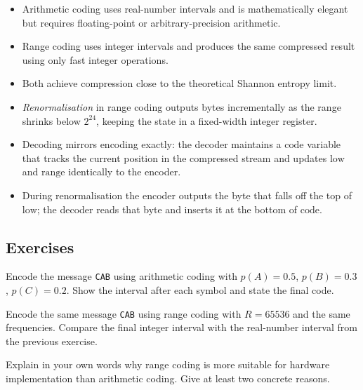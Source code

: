 \begin{itemize}[leftmargin=2em]
    \item Arithmetic coding uses real-number intervals and is mathematically 
          elegant but requires floating-point or arbitrary-precision arithmetic.
    \item Range coding uses integer intervals and produces the same compressed
          result using only fast integer operations.
    \item Both achieve compression close to the theoretical Shannon entropy 
          limit.
    \item \emph{Renormalisation} in range coding outputs bytes incrementally 
          as the range shrinks below $2^{24}$, keeping the state in a 
          fixed-width integer register.
    \item Decoding mirrors encoding exactly: the decoder maintains a 
          $\mathrm{code}$ variable that tracks the current position in the 
          compressed stream and updates $\mathrm{low}$ and $\mathrm{range}$ 
          identically to the encoder.
    \item During renormalisation the encoder outputs the byte that falls off 
          the top of $\mathrm{low}$; the decoder reads that byte and inserts 
          it at the bottom of $\mathrm{code}$.
\end{itemize}

\subsection{Exercises}

\begin{exercisebox}
Encode the message \texttt{CAB} using arithmetic coding with $p(A)=0.5$,
$p(B)=0.3$, $p(C)=0.2$.  Show the interval after each symbol and state the
final code.
\end{exercisebox}

\begin{exercisebox}
Encode the same message \texttt{CAB} using range coding with $R=65536$ and
the same frequencies.  Compare the final integer interval with the
real-number interval from the previous exercise.
\end{exercisebox}

\begin{exercisebox}
Explain in your own words why range coding is more suitable for hardware
implementation than arithmetic coding.  Give at least two concrete reasons.
\end{exercisebox}


